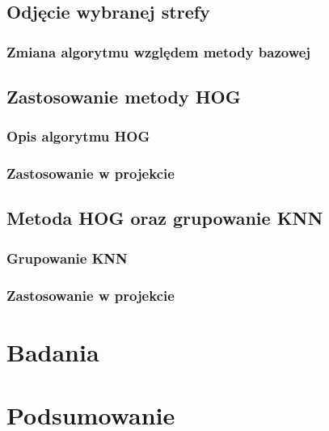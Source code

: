 \documentclass[a4paper,twoside,12pt]{book}
\newcounter{stronyPozaNumeracja}
\begin{document}
    \section{Odjęcie wybranej strefy}

    \subsection{Zmiana algorytmu względem metody bazowej}

    \section{Zastosowanie metody HOG}
    \subsection{Opis algorytmu HOG}
    \subsection{Zastosowanie w projekcie}

    \section{Metoda HOG oraz grupowanie KNN}
    \subsection{Grupowanie KNN}
    \subsection{Zastosowanie w projekcie}
    \chapter{Badania}

    \chapter{Podsumowanie}



    \backmatter
    \setcounter{page}{\value{stronyPozaNumeracja}}
\end{document}
